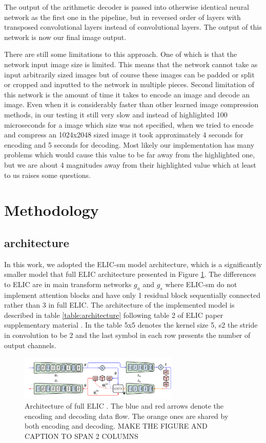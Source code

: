 \documentclass{article}
\begin{document}
The output of the arithmetic decoder is passed into otherwise identical neural network as the first one in the pipeline, but in reversed order of layers with transposed convolutional layers instead of convolutional layers.
The output of this network is now our final image output. 

There are still some limitations to this approach. 
One of which is that the network input image size is limited.
This means that the network cannot take as input arbitrarily sized images but of course these images can be padded or split or cropped and inputted to the network in multiple pieces.
Second limitation of this network is the amount of time it takes to encode an image and decode an image. 
Even when it is considerably faster than other learned image compression methods, in our testing it still very slow and instead of highlighted 100 microseconds for a image which size was not specified, when we tried to encode and compress an 1024x2048 sized image it took approximately 4 seconds for encoding and 5 seconds for decoding.
Most likely our implementation has many problems which would cause this value to be far away from the highlighted one, but we are about 4 magnitudes away from their highlighted value which at least to us raises some questions.

\section{Methodology}
\label{sec:methods}
\subsection{architecture}
\label{sec:architecture}
In this work, we adopted the ELIC-sm model architecture, which is a significantly smaller model that full ELIC architecture presented in Figure \ref{fig:architecture}. The differences to ELIC are in main transform networks $g_a$ and $g_s$ where ELIC-sm do not implement attention blocks and have only 1 residual block sequentially connected rather than 3 in full ELIC. The architecture of the implemented model is described in table \ref{table:architecture} following table 2 of ELIC paper supplementary material \cite{ELIC}. In the table 5x5 denotes the kernel size 5, s2 the stride in convolution to be 2 and the last symbol in each row presents the number of output channels. 
\begin{figure}
    \centering
    \includegraphics[width=3in]{architecture.png}
    \caption{Architecture of full ELIC \cite{ELIC}. The
blue and red arrows denote the encoding and decoding data flow. The orange ones are shared by both encoding and decoding. MAKE THE FIGURE AND CAPTION TO SPAN 2 COLUMNS}
    \label{fig:architecture}
\end{figure}
\end{document}
